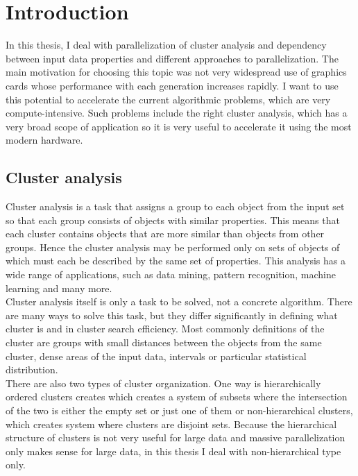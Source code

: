 \chapter{Introduction}

In this thesis, I deal with parallelization of cluster analysis and dependency between input data properties and different approaches to parallelization.
The main motivation for choosing this topic was not very widespread use of graphics cards whose performance with each generation increases rapidly. I want to use this potential to accelerate the current algorithmic problems, which are very compute-intensive. Such problems include the right cluster analysis, which has a very broad scope of application so it is very useful to accelerate it using the most modern hardware.

\section{Cluster analysis} \label{sec:clusteranalysis}
Cluster analysis is a task that assigns a group to each object from the input set so that each group consists of objects with similar properties. This means that each cluster contains objects that are more similar than objects from other groups. Hence the cluster analysis may be performed only on sets of objects of which must each be described by the same set of properties. This analysis has a wide range of applications, such as data mining, pattern recognition, machine learning and many more.\\
Cluster analysis itself is only a task to be solved, not a concrete algorithm. There are many ways to solve this task, but they differ significantly in defining what cluster is and in cluster search efficiency. Most commonly definitions of the cluster are groups with small distances between the objects from the same cluster, dense areas of the input data, intervals or particular statistical distribution.\\
There are also two types of cluster organization. One way is hierarchically ordered clusters creates which creates a system of subsets where the intersection of the two is either the empty set or just one of them or non-hierarchical clusters, which creates system where clusters are disjoint sets. Because the hierarchical structure of clusters is not very useful for large data and massive parallelization only makes sense for large data, in this thesis I deal with non-hierarchical type only.

